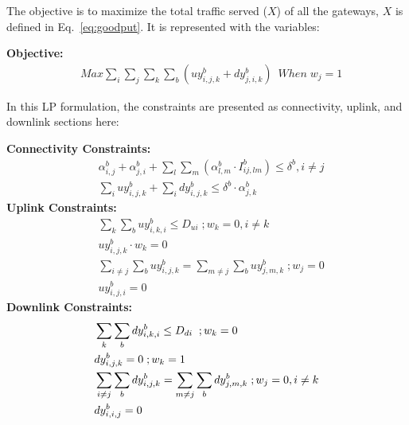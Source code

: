 The objective is to maximize the total traffic served ($X$) of all the gateways, $X$ is defined in Eq.~\ref{eq:goodput}.
It is represented with the variables:

\noindent
{\bf Objective:}
\begin{align}
& Max \sum_i\sum_j\sum_k\sum_b(uy_{i,j,k}^b+dy_{j,i,k}^b) \;\ When \; w_j=1 
\end{align}

In this LP formulation, the constraints are presented as connectivity, uplink, and downlink sections here:  

\noindent
{\bf Connectivity Constraints:}
\begin{align}
\label{opt:1}
& \alpha_{i,j}^b + \alpha_{j,i}^b + \sum_l\sum_m(\alpha_{l,m}^b \cdot I_{ij,lm}^b) \leq \delta^b, i\neq j \\
\label{opt:2}
& \sum_i uy_{i,j,k}^b + \sum_i dy_{i,j,k}^b \leq \delta^b \cdot \alpha_{j,k}^b 
\end{align}
\noindent
{\bf Uplink Constraints:} 
\begin{align}
\label{opt:3}
& \sum_k \sum_b uy_{i,k,i}^b \leq D_{ui}  \; ; w_k=0, i \neq k \\
\label{opt:4}
& uy_{i,j,k}^b \cdot w_k = 0 \\
\label{opt:6}
& \sum_{i\neq j}\sum_b uy_{i,j,k}^b = \sum_{m\neq j} \sum_b uy_{j,m,k}^b \; ;w_j = 0\\
\label{opt:7}
& uy_{i,j,i}^b=0 
\end{align}
\noindent
{\bf Downlink Constraints:} 
\begin{align}
{\bf}
\label{opt:8}
& \sum_k \sum_b dy_{i,k,i}^b \leq D_{di} \; \; ; w_k=0 \\
\label{opt:9}
& dy_{i,j,k}^b =0  \; ;w_k=1 \\
\label{opt:11}
& \sum_{i\neq j} \sum_b dy_{i,j,k}^b = \sum_{m \neq j} \sum_b dy_{j,m,k}^b   \; ; w_j=0, i \neq k \\
\label{opt:12}
& dy_{i,i,j}^b=0
\end{align}


